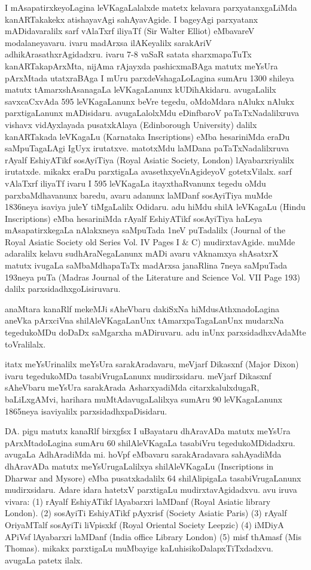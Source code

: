 \documentclass[11pt,a4size]{article}
\begin{document}
I mAsapatirxkeyoLagina leVKagaLalalxde matetx kelavara
parxyatanxgaLiMda kanARTakakekx atishayavAgi sahAyavAgide. I bageyAgi
parxyatanx mADidavaralilx sarf vAlaTxrf iliyaTf {\rm
    (Sir Walter Elliot)} eMbavareV modalaneyavaru. ivaru madArxsa
ilAKeyalilx sarakAriV adhikArasathxrAgidadxru. ivaru 7-8 vaSaR satata
sharxmapaTuTx kanARTakapArxMta, nijAma rAjayxda pashicxmaBAga matutx
meYsUra pArxMtada utatxraBAga I mUru parxdeVshagaLoLagina sumAru 1300
shileya matutx tAmarxshAsanagaLa leVKagaLanunx
kUDihAkidaru. avugaLalilx savxcaCxvAda 595 leVKagaLanunx beVre tegedu,
oMdoMdara nAlukx nAlukx parxtigaLanunx mADisidaru. avugaLalolxMdu
eDinfbaroV paTaTxNadalilxruva vishavx vidAyxlayada pusatxkAlaya
{\rm (Edinborough University)} dalilx kanARTakada
leVKagaLu {\rm (Karnataka Inscriptions)} eMba
hesariniMda eraDu saMpuTagaLAgi IgUyx irutatxve. matotxMdu laMDana
paTaTxNadalilxruva rAyalf EshiyATikf sosAyiTiya {\rm
    (Royal Asiatic Society, London)} lAyabarxriyalilx
irutatxde. mikakx eraDu parxtigaLa avasethxyeVnAgideyoV
gotetxVilalx. sarf vAlaTxrf iliyaTf ivaru I 595 leVKagaLa
itayxthaRvanunx tegedu oMdu parxbaMdhavanunx baredu, avaru adanunx
laMDanf sosAyiTiya muMde 1836neya isaviya juleY tiMgaLalilx
Odidaru. adu hiMdu shilA leVKagaLu {\rm (Hindu
    Inscriptions)} eMba hesariniMda rAyalf EshiyATikf sosAyiTiya
haLeya mAsapatirxkegaLa nAlakxneya saMpuTada 1neV puTadalilx
{\rm (Journal of the Royal Asiatic Society old Series
    Vol. IV Pages I \& C)} mudirxtavAgide. muMde adaralilx kelavu
sudhAraNegaLanunx mADi avaru vAknamxya shAsatxrX matutx ivugaLa
saMbaMdhapaTaTx madArxsa janaRlina 7neya saMpuTada 193neya puTa
{\rm (Madras Journal of the Literature and Science
    Vol. VII Page 193)} dalilx parxsidadhxgoLisiruvaru.

anaMtara kanaRlf mekeMJi sAheVbaru dakiSxNa hiMdusAthxnadoLagina
aneVka pArxciVna shilAleVKagaLanUnx tAmarxpaTagaLanUnx mudarxNa
tegedukoMDu doDaDx saMgarxha mADiruvaru. adu inUnx parxsidadhxvAdaMte
toVralilalx.

itatx meYsUrinalilx meYsUra sarakAradavaru, meVjarf Dikasxnf
{\rm (Major Dixon)} ivaru tegedukoMDa tasabiVrugaLanunx
mudirxsidaru. meVjarf Dikasxnf sAheVbaru meYsUra sarakArada
AsharxyadiMda citarxkalulxdugaR, baLiLxgAMvi, harihara
muMtAdavugaLalilxya sumAru 90 leVKagaLanunx 1865neya isaviyalilx
parxsidadhxpaDisidaru.

DA. pigu matutx kanaRlf birxgfsx I uBayataru dhAravADa matutx meYsUra
pArxMtadoLagina sumAru 60 shilAleVKagaLa tasabiVru
tegedukoMDidadxru. avugaLa AdhAradiMda mi. hoVpf eMbavaru
sarakAradavara sahAyadiMda dhAravADa matutx meYsUrugaLalilxya
shilAleVKagaLu {\rm (Inscriptions in Dharwar and
    Mysore)} eMba pusatxkadalilx 64 shilAlipigaLa tasabiVrugaLanunx
mudirxsidaru. Adare idara hatetxV parxtigaLu mudirxtavAgidadxvu. avu
iruva vivara: (1) rAyalf EshiyATikf lAyabarxri laMDanf
{\rm (Royal Asiatic library London)}. (2) sosAyiTi
EshiyATikf pAyxrisf {\rm (Society Asiatic Paris)} (3)
rAyalf OriyaMTalf sosAyiTi liVpisxkf {\rm (Royal
    Oriental Society Leepzic)} (4) iMDiyA APiVsf lAyabarxri laMDanf
{\rm (India office Library London)} (5) misf thAmasf
{\rm (Mis Thomas)}. mikakx parxtigaLu muMbayige
kaLuhisikoDalapxTiTxdadxvu. avugaLa patetx ilalx.
\end{document}
